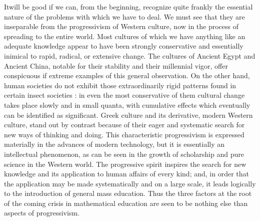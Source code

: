 It\pageoriginale will be good if we can, from the beginning, recognize quite frankly the essential nature of the problems with which we have to deal. We must see that they are inseparable from the progressivism of Western culture, now in the process of spreading to the entire world. Most cultures of which we have anything like an adequate knowledge appear to have been strongly conservative and essentially inimical to rapid, radical, or extensive change. The cultures of Ancient Egypt and Ancient China, notable for their stability and their millennial vigor, offer conspicuous if extreme examples of this general observation. On the other hand, human societies do not exhibit those extraordinarily rigid patterns found in certain insect societies : in even the most conservative of them cultural change takes place slowly and in small quanta, with cumulative effects which eventually can be identified as significant. Greek culture and its derivative, modern Western culture, stand out by contrast because of their eager and systematic search for new ways of thinking and doing. This characteristic progressivism is expressed materially in the advances of modern technology, but it is essentially an intellectual phenomenon, as can be seen in the growth of scholarship and pure science in the Western world. The progressive spirit inspires the search for new knowledge and its application to human affairs of every kind; and, in order that the application may be made systematically and on a large scale, it leads logically to the introduction of general mass education. Thus the three factors at the root of the coming crisis in mathematical education are seen to be nothing else than aspects of progressivism.

